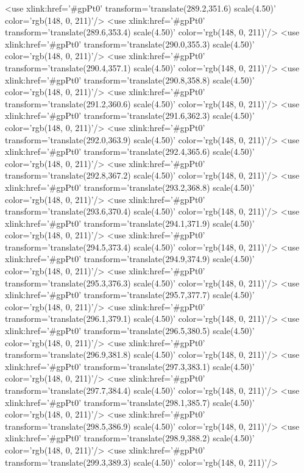 	<use xlink:href='#gpPt0' transform='translate(289.2,351.6) scale(4.50)' color='rgb(148,   0, 211)'/>
	<use xlink:href='#gpPt0' transform='translate(289.6,353.4) scale(4.50)' color='rgb(148,   0, 211)'/>
	<use xlink:href='#gpPt0' transform='translate(290.0,355.3) scale(4.50)' color='rgb(148,   0, 211)'/>
	<use xlink:href='#gpPt0' transform='translate(290.4,357.1) scale(4.50)' color='rgb(148,   0, 211)'/>
	<use xlink:href='#gpPt0' transform='translate(290.8,358.8) scale(4.50)' color='rgb(148,   0, 211)'/>
	<use xlink:href='#gpPt0' transform='translate(291.2,360.6) scale(4.50)' color='rgb(148,   0, 211)'/>
	<use xlink:href='#gpPt0' transform='translate(291.6,362.3) scale(4.50)' color='rgb(148,   0, 211)'/>
	<use xlink:href='#gpPt0' transform='translate(292.0,363.9) scale(4.50)' color='rgb(148,   0, 211)'/>
	<use xlink:href='#gpPt0' transform='translate(292.4,365.6) scale(4.50)' color='rgb(148,   0, 211)'/>
	<use xlink:href='#gpPt0' transform='translate(292.8,367.2) scale(4.50)' color='rgb(148,   0, 211)'/>
	<use xlink:href='#gpPt0' transform='translate(293.2,368.8) scale(4.50)' color='rgb(148,   0, 211)'/>
	<use xlink:href='#gpPt0' transform='translate(293.6,370.4) scale(4.50)' color='rgb(148,   0, 211)'/>
	<use xlink:href='#gpPt0' transform='translate(294.1,371.9) scale(4.50)' color='rgb(148,   0, 211)'/>
	<use xlink:href='#gpPt0' transform='translate(294.5,373.4) scale(4.50)' color='rgb(148,   0, 211)'/>
	<use xlink:href='#gpPt0' transform='translate(294.9,374.9) scale(4.50)' color='rgb(148,   0, 211)'/>
	<use xlink:href='#gpPt0' transform='translate(295.3,376.3) scale(4.50)' color='rgb(148,   0, 211)'/>
	<use xlink:href='#gpPt0' transform='translate(295.7,377.7) scale(4.50)' color='rgb(148,   0, 211)'/>
	<use xlink:href='#gpPt0' transform='translate(296.1,379.1) scale(4.50)' color='rgb(148,   0, 211)'/>
	<use xlink:href='#gpPt0' transform='translate(296.5,380.5) scale(4.50)' color='rgb(148,   0, 211)'/>
	<use xlink:href='#gpPt0' transform='translate(296.9,381.8) scale(4.50)' color='rgb(148,   0, 211)'/>
	<use xlink:href='#gpPt0' transform='translate(297.3,383.1) scale(4.50)' color='rgb(148,   0, 211)'/>
	<use xlink:href='#gpPt0' transform='translate(297.7,384.4) scale(4.50)' color='rgb(148,   0, 211)'/>
	<use xlink:href='#gpPt0' transform='translate(298.1,385.7) scale(4.50)' color='rgb(148,   0, 211)'/>
	<use xlink:href='#gpPt0' transform='translate(298.5,386.9) scale(4.50)' color='rgb(148,   0, 211)'/>
	<use xlink:href='#gpPt0' transform='translate(298.9,388.2) scale(4.50)' color='rgb(148,   0, 211)'/>
	<use xlink:href='#gpPt0' transform='translate(299.3,389.3) scale(4.50)' color='rgb(148,   0, 211)'/>

